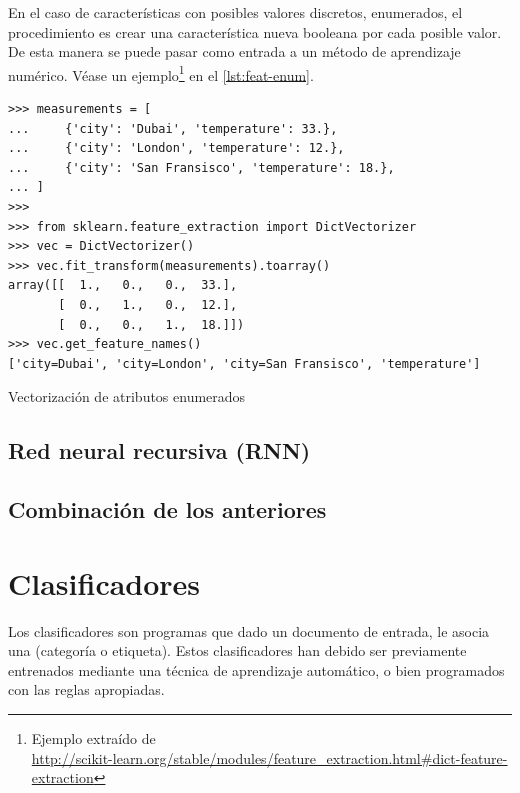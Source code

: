 En el caso de características con posibles valores discretos, enumerados, el procedimiento es crear una característica nueva booleana por cada posible valor. De esta manera se puede pasar como entrada a un método de aprendizaje numérico. Véase un ejemplo\footnote{Ejemplo extraído de\\
\url{http://scikit-learn.org/stable/modules/feature_extraction.html\#dict-feature-extraction}} en el \autoref{lst:feat-enum}.

\begin{listing}[htbp]
\begin{verbatim}
>>> measurements = [
...     {'city': 'Dubai', 'temperature': 33.},
...     {'city': 'London', 'temperature': 12.},
...     {'city': 'San Fransisco', 'temperature': 18.},
... ]
>>> 
>>> from sklearn.feature_extraction import DictVectorizer
>>> vec = DictVectorizer()
>>> vec.fit_transform(measurements).toarray()
array([[  1.,   0.,   0.,  33.],
       [  0.,   1.,   0.,  12.],
       [  0.,   0.,   1.,  18.]])
>>> vec.get_feature_names()
['city=Dubai', 'city=London', 'city=San Fransisco', 'temperature']
\end{verbatim}
\caption{Vectorización de atributos enumerados}
\label{lst:feat-enum}
\end{listing}


\subsection{Red neural recursiva (RNN)} 

\citep{Socher2013}

\subsection{Combinación de los anteriores}


\section{Clasificadores}

Los clasificadores son programas que dado un documento de entrada, le asocia una  (categoría o etiqueta). Estos clasificadores han debido ser previamente entrenados mediante una técnica de aprendizaje automático, o bien programados con las reglas apropiadas.

